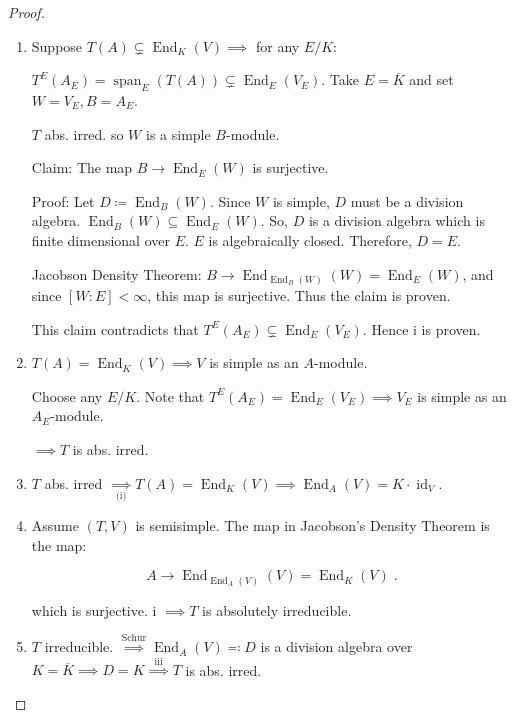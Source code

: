 \documentclass{article}
\theoremstyle{definition}
\theoremstyle{plain}
\theoremstyle{remark}
\begin{document}
    \begin{proof}

        \ \

        \begin{enumerate}[label=\roman*)]
            \item[i\(\implies\):] Suppose \(T(A) \subsetneq \operatorname{End}_K(V) \implies\) for any \(E / K\):
            
            \(T^E(A_E) = \operatorname{span}_E(T(A)) \subsetneq \operatorname{End}_E(V_E)\). Take \(E = \overline{K}\) and set \(W = V_E, B = A_E\).

            \(T\) abs. irred. so \(W\) is a simple \(B\)-module.
            
            Claim: The map \(B \to \operatorname{End}_E(W)\) is surjective.

            Proof: Let \(D \coloneqq \operatorname{End}_B(W)\). Since \(W\) is simple, \(D\) must be a division algebra. \(\operatorname{End}_B(W) \subseteq \operatorname{End}_E(W)\). So, \(D\) is a division algebra which is finite dimensional over \(E\). \(E\) is algebraically closed. Therefore, \(D = E\).

            Jacobson Density Theorem: \(B \to \operatorname{End}_{\operatorname{End}_B(W)}(W) = \operatorname{End}_E(W)\), and since \([W:E] < \infty\), this map is surjective. Thus the claim is proven.

            This claim contradicts that \(T^E(A_E) \subsetneq \operatorname{End}_E(V_E)\). Hence i is proven.

            \item[i \(\impliedby\):] \(T(A) = \operatorname{End}_K(V) \implies V\) is simple as an \(A\)-module.
            
            Choose any \(E / K\). Note that \(T^E(A_E) = \operatorname{End}_E(V_E) \implies V_E\) is simple as an \(A_E\)-module.

            \(\implies T\) is abs. irred.

            \item[ii :] \(T\) abs. irred \(\underset{\text{(i)}}{\implies} T(A)=\operatorname{End}_K(V) \implies \operatorname{End}_A(V) = K \cdot \operatorname{id}_{V}\).
            
            \item[iii :] Assume \((T,V)\) is semisimple. The map in Jacobson's Density Theorem is the map:
            
            \[
                A \to \operatorname{End}_{\operatorname{End}_A(V)}(V) = \operatorname{End}_K(V)\;.
            \]

            which is surjective. i \(\implies T\) is absolutely irreducible.

            \item[iv :] \(T\) irreducible. \(\overset{\text{Schur}}{\implies} \operatorname{End}_A(V) \eqqcolon D\) is a division algebra over \(K = \overline{K} \implies D = K \overset{\text{iii}}{\implies} T\) is abs. irred. 
        \end{enumerate} 
    \end{proof}
\end{document}

